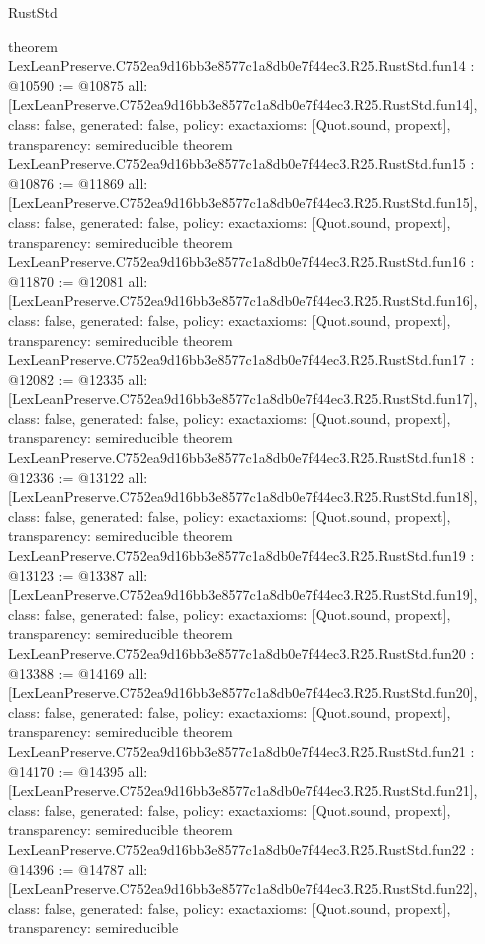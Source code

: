 \begin{lexlean}{RustStd}
\begin{coremodule}
{}
theorem LexLeanPreserve.C752ea9d16bb3e8577c1a8db0e7f44ec3.R25.RustStd.fun14 : @10590 := @10875 {
  all: [LexLeanPreserve.C752ea9d16bb3e8577c1a8db0e7f44ec3.R25.RustStd.fun14],
  class: false,
  generated: false,
  policy: exact{axioms: [Quot.sound, propext]},
  transparency: semireducible
}
theorem LexLeanPreserve.C752ea9d16bb3e8577c1a8db0e7f44ec3.R25.RustStd.fun15 : @10876 := @11869 {
  all: [LexLeanPreserve.C752ea9d16bb3e8577c1a8db0e7f44ec3.R25.RustStd.fun15],
  class: false,
  generated: false,
  policy: exact{axioms: [Quot.sound, propext]},
  transparency: semireducible
}
theorem LexLeanPreserve.C752ea9d16bb3e8577c1a8db0e7f44ec3.R25.RustStd.fun16 : @11870 := @12081 {
  all: [LexLeanPreserve.C752ea9d16bb3e8577c1a8db0e7f44ec3.R25.RustStd.fun16],
  class: false,
  generated: false,
  policy: exact{axioms: [Quot.sound, propext]},
  transparency: semireducible
}
theorem LexLeanPreserve.C752ea9d16bb3e8577c1a8db0e7f44ec3.R25.RustStd.fun17 : @12082 := @12335 {
  all: [LexLeanPreserve.C752ea9d16bb3e8577c1a8db0e7f44ec3.R25.RustStd.fun17],
  class: false,
  generated: false,
  policy: exact{axioms: [Quot.sound, propext]},
  transparency: semireducible
}
theorem LexLeanPreserve.C752ea9d16bb3e8577c1a8db0e7f44ec3.R25.RustStd.fun18 : @12336 := @13122 {
  all: [LexLeanPreserve.C752ea9d16bb3e8577c1a8db0e7f44ec3.R25.RustStd.fun18],
  class: false,
  generated: false,
  policy: exact{axioms: [Quot.sound, propext]},
  transparency: semireducible
}
theorem LexLeanPreserve.C752ea9d16bb3e8577c1a8db0e7f44ec3.R25.RustStd.fun19 : @13123 := @13387 {
  all: [LexLeanPreserve.C752ea9d16bb3e8577c1a8db0e7f44ec3.R25.RustStd.fun19],
  class: false,
  generated: false,
  policy: exact{axioms: [Quot.sound, propext]},
  transparency: semireducible
}
theorem LexLeanPreserve.C752ea9d16bb3e8577c1a8db0e7f44ec3.R25.RustStd.fun20 : @13388 := @14169 {
  all: [LexLeanPreserve.C752ea9d16bb3e8577c1a8db0e7f44ec3.R25.RustStd.fun20],
  class: false,
  generated: false,
  policy: exact{axioms: [Quot.sound, propext]},
  transparency: semireducible
}
theorem LexLeanPreserve.C752ea9d16bb3e8577c1a8db0e7f44ec3.R25.RustStd.fun21 : @14170 := @14395 {
  all: [LexLeanPreserve.C752ea9d16bb3e8577c1a8db0e7f44ec3.R25.RustStd.fun21],
  class: false,
  generated: false,
  policy: exact{axioms: [Quot.sound, propext]},
  transparency: semireducible
}
theorem LexLeanPreserve.C752ea9d16bb3e8577c1a8db0e7f44ec3.R25.RustStd.fun22 : @14396 := @14787 {
  all: [LexLeanPreserve.C752ea9d16bb3e8577c1a8db0e7f44ec3.R25.RustStd.fun22],
  class: false,
  generated: false,
  policy: exact{axioms: [Quot.sound, propext]},
  transparency: semireducible
}
\end{coremodule}
\end{lexlean}
